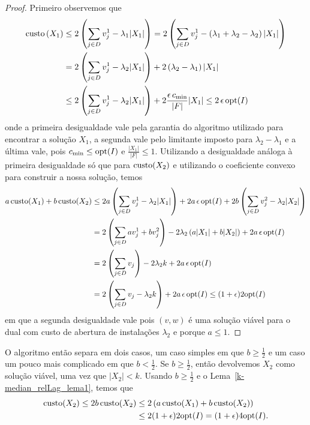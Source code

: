 \begin{proof}
Primeiro observemos que 
\begin{subequations}
    \begin{align*}
        \mathrm{custo}\left(X_1\right) &\leq 2\left(\sum_{j \in D} v_j^1 - \lambda_1|X_1|\right) = 2\left(\sum_{j\in D} v_j^1 - \left( \lambda_1 + \lambda_2 - \lambda_2 \right)|X_1|\right)\\
        & = 2 \left(\sum_{j \in D} v_j^1 - \lambda_2 |X_1| \right) + 2 \left(\lambda_2 - \lambda_1\right) |X_1| \\
        &\leq 2 \left(\sum_{j \in D} v_j^1 - \lambda_2 |X_1| \right) + 2\frac{\epsilon\, c_{\min}}{|F|}|X_1| \leq 2 \, \epsilon \, \mathrm{opt}(I)
    \end{align*}
\end{subequations}
onde a primeira desigualdade vale pela garantia do algoritmo utilizado para encontrar a solução $X_1$, a segunda vale pelo limitante imposto para $\lambda_2 - \lambda_1$ e a última vale, pois $c_{\min} \leq \mathrm{opt}(I)$ e $\frac{|X_1|}{|F|} \leq 1$. Utilizando a desigualdade análoga à primeira desigualdade só que para $\mathrm{custo}(X_2)$ e utilizando o coeficiente convexo para construir a nossa solução, temos
\begin{subequations}
    \begin{align*}
        a \, \mathrm{custo}(X_1) + b \,\mathrm{custo}(X_2) &\leq 2a \left(\sum_{j\in D} v_j^1 - \lambda_2|X_1|\right) + 2a\, \epsilon\,\mathrm{opt}(I) + 2b\left(\sum_{j\in D} v_j^2 - \lambda_2|X_2|\right) \\
        &= 2\left(\sum_{j \in D} a v_j^1 + b v_j^2\right) - 2\lambda_2\left( a|X_1| + b|X_2|\right) + 2a\,\epsilon\,\mathrm{opt}(I)\\
        & = 2\left(\sum_{j\in D } v_j\right) - 2\lambda_2 k + 2a\,\epsilon\,\mathrm{opt}(I)\\
        & = 2\left( \sum_{j \in D } v_j -\lambda_2 k\right) + 2a\,\epsilon\,\mathrm{opt}(I) \leq (1+\epsilon)2\mathrm{opt}(I)
    \end{align*}
\end{subequations}
em que a segunda desigualdade vale pois $(v,w)$ é uma solução viável para o dual com custo de abertura de instalações $\lambda_2$ e porque $a \leq 1$.
\end{proof}

O algoritmo então separa em dois casos, um caso simples em que $b \geq \frac{1}{2}$ e um caso um pouco mais complicado em que $b < \frac{1}{2}$. Se $b \geq \frac{1}{2}$, então devolvemos $X_2$ como solução viável, uma vez que $|X_2| < k$. Usando $b \geq \frac{1}{2}$ e o Lema~\ref{k-median_relLag_lema1}, temos que
\begin{subequations}
    \begin{align*}
        \mathrm{custo}(X_2) \leq 2b\,\mathrm{custo}(X_2) &\leq 2\left(a\,\mathrm{custo}(X_1) + b\,\mathrm{custo}(X_2) \right) \\
        &\leq 2(1+\epsilon) 2\mathrm{opt}(I) = (1+\epsilon)4\mathrm{opt}(I).
    \end{align*}
\end{subequations}

